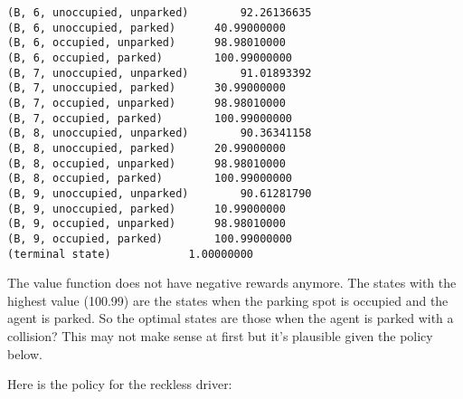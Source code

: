 \documentclass[paper=a4, fontsize=11pt]{scrartcl}
\begin{document}
\begin{verbatim}
(B, 6, unoccupied, unparked)		92.26136635
(B, 6, unoccupied, parked)		40.99000000
(B, 6, occupied, unparked)		98.98010000
(B, 6, occupied, parked)		100.99000000
(B, 7, unoccupied, unparked)		91.01893392
(B, 7, unoccupied, parked)		30.99000000
(B, 7, occupied, unparked)		98.98010000
(B, 7, occupied, parked)		100.99000000
(B, 8, unoccupied, unparked)		90.36341158
(B, 8, unoccupied, parked)		20.99000000
(B, 8, occupied, unparked)		98.98010000
(B, 8, occupied, parked)		100.99000000
(B, 9, unoccupied, unparked)		90.61281790
(B, 9, unoccupied, parked)		10.99000000
(B, 9, occupied, unparked)		98.98010000
(B, 9, occupied, parked)		100.99000000
(terminal state)			1.00000000
\end{verbatim}

The value function does not have negative rewards anymore. The states with the highest value (100.99) are the states when the parking spot is occupied and the agent is parked. So the optimal states are those when the agent is parked with a collision? This may not make sense at first but it's plausible given the policy below.

Here is the policy for the reckless driver:
\end{document}
